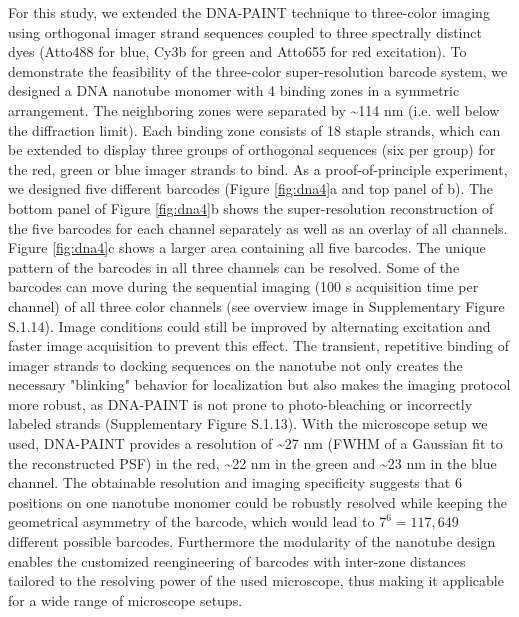 For this study, we extended the DNA-PAINT technique to three-color imaging 
using orthogonal imager strand sequences coupled to three spectrally distinct dyes 
(Atto488 for blue, Cy3b for green and Atto655 for red excitation). To demonstrate the 
feasibility of the three-color super-resolution barcode system, we designed a DNA 
nanotube monomer with 4 binding zones in a symmetric arrangement. The neighboring 
zones were separated by \textasciitilde114 nm (i.e. well below the diffraction limit). Each binding 
zone consists of 18 staple strands, which can be extended to display three groups of 
orthogonal sequences (six per group) for the red, green or blue imager strands to bind. As 
a proof-of-principle experiment, we designed five different barcodes (Figure \ref{fig:dna4}a and top 
panel of b). The bottom panel of Figure \ref{fig:dna4}b shows the super-resolution reconstruction of 
the five barcodes for each channel separately as well as an overlay of all channels. Figure 
 \ref{fig:dna4}c shows a larger area containing all five barcodes. The unique pattern of the barcodes in 
all three channels can be resolved. Some of the barcodes can move during the sequential 
imaging (100 s acquisition time per channel) of all three color channels (see overview 
image in  Supplementary Figure 
S.1.14). Image conditions could still be improved by alternating excitation 
and faster image acquisition to prevent this effect. The transient, repetitive binding of 
imager strands to docking sequences on the nanotube not only creates the necessary 
"blinking" behavior for localization but also makes the imaging protocol more robust, as 
DNA-PAINT is not prone to photo-bleaching or incorrectly labeled strands (Supplementary Figure 
S.1.13). 
With the microscope setup we used, DNA-PAINT provides a resolution of \textasciitilde27 nm 
(FWHM of a Gaussian fit to the reconstructed PSF) in the red, \textasciitilde22 nm in the green and 
\textasciitilde23 nm in the blue channel. The obtainable resolution and imaging specificity suggests 
that 6 positions on one nanotube monomer could be robustly resolved while keeping the 
geometrical asymmetry of the barcode, which would lead to $7^6=117,649$ different 
possible barcodes. Furthermore the modularity of the nanotube design enables the 
customized reengineering of barcodes with inter-zone distances tailored to the resolving 
power of the used microscope, thus making it applicable for a wide range of microscope 
setups.

